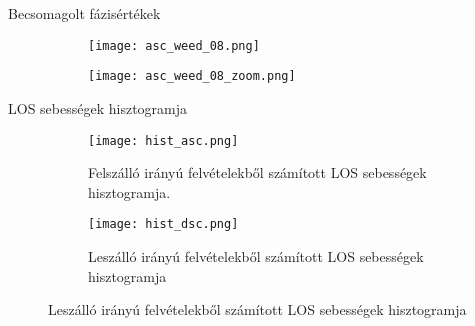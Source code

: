 \documentclass[14pt, aspectratio=169]{beamer}
\newcommand{\backupend}{
   \setcounter{framenumber}{\value{finalframe}}
}
\begin{document}

\begin{frame}{Becsomagolt fázisértékek}
    \begin{center}
        \begin{figure}
            \begin{subfigure}[t]{.49\linewidth}
                \centering
                \texttt{[image: asc\_weed\_08.png]}
            \end{subfigure}
            \begin{subfigure}[t]{.49\linewidth}
                \centering
                \texttt{[image: asc\_weed\_08\_zoom.png]}
            \end{subfigure}
        \end{figure}
    \end{center}
\end{frame}


\begin{frame}{LOS sebességek hisztogramja}
    \begin{center}
        \begin{figure}
            \begin{subfigure}[t]{.49\linewidth}
                \centering
                \texttt{[image: hist\_asc.png]}
                \caption{Felszálló irányú felvételekből számított LOS sebességek hisztogramja.}
            \end{subfigure}
            \begin{subfigure}[t]{.49\linewidth}
                \centering
                \texttt{[image: hist\_dsc.png]}
                \caption{Leszálló irányú felvételekből számított LOS sebességek hisztogramja}
            \end{subfigure}
        \end{figure}
    \end{center}
\end{frame}

\backupend
\end{document}
